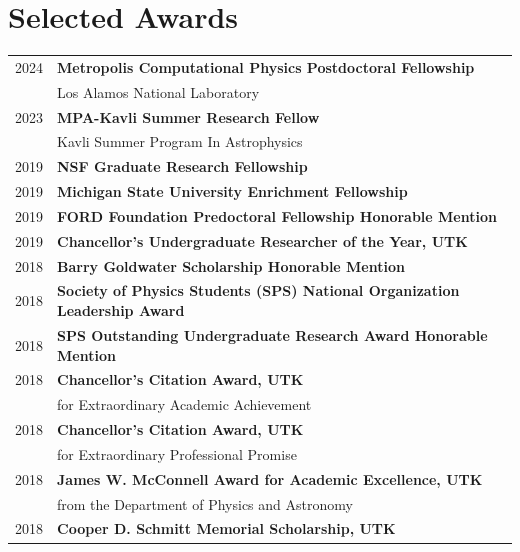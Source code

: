 \documentclass[letterpaper]{deedy-resume} %
\begin{document}
\begin{minipage}[t]{0.63\textwidth}
\section{Selected Awards}
\begin{tabular}{rl}
  2024 & \textbf{Metropolis Computational Physics Postdoctoral Fellowship} \\ 
       & Los Alamos National Laboratory \\
  2023 & \textbf{MPA-Kavli Summer Research Fellow} \\
       & Kavli Summer Program In Astrophysics \\
  2019 & \textbf{NSF Graduate Research Fellowship} \\
  2019 & \textbf{Michigan State University Enrichment Fellowship} \\
  2019 & \textbf{FORD Foundation Predoctoral Fellowship Honorable Mention} \\
  2019 & \textbf{Chancellor's Undergraduate Researcher of the Year, UTK} \\
  2018 & \textbf{Barry Goldwater Scholarship Honorable Mention} \\
  2018 & \textbf{Society of Physics Students (SPS) National Organization Leadership Award} \\
  2018 & \textbf{SPS Outstanding Undergraduate Research Award Honorable Mention}\\
  2018 & \textbf{Chancellor’s Citation Award, UTK}\\ & for Extraordinary Academic Achievement \\
  2018 & \textbf{Chancellor’s Citation Award, UTK}\\ &  for Extraordinary Professional Promise \\
  2018 & \textbf{James W. McConnell Award for Academic Excellence, UTK} \\
          &  from the Department of Physics and Astronomy \\
  2018 & \textbf{Cooper D. Schmitt Memorial Scholarship, UTK}\\

\end{tabular}
\end{minipage}
\end{document}
